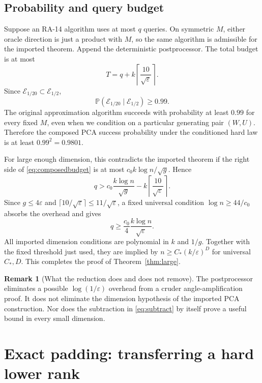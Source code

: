 \documentclass[11pt]{article}
\numberwithin{equation}{section}
\theoremstyle{definition}
\newtheorem{remark}[theorem]{Remark}
\newcommand{\Prb}{\mathbb P}
\newcommand{\eps}{\varepsilon}
\newcommand{\cgood}{\mathcal E}
\begin{document}
\subsection{Probability and query budget}
Suppose an RA-14 algorithm uses at most $q$ queries. On symmetric $M$, either
oracle direction is just a product with $M$, so the same algorithm is
admissible for the imported theorem. Append the deterministic postprocessor.
The total budget is at most
\begin{equation}
 T=q+k\left\lceil\frac{10}{\sqrt\eps}\right\rceil.
 \label{eq:composedbudget}
\end{equation}
Since $\cgood_{1/20}\subset\cgood_{1/2}$,
\[
 \Prb(\cgood_{1/20}\mid\cgood_{1/2})\ge0.99.
\]
The original approximation algorithm succeeds with probability at least
$0.99$ for every fixed $M$, even when we condition on a particular generating
pair $(W,U)$. Therefore the composed PCA success probability under the
conditioned hard law is at least $0.99^2=0.9801$.

For large enough dimension, this contradicts the imported theorem if the
right side of \eqref{eq:composedbudget} is at most
$c_0k\log n/\sqrt g$. Hence
\begin{equation}
 q>c_0\frac{k\log n}{\sqrt g}
     -k\left\lceil\frac{10}{\sqrt\eps}\right\rceil.
 \label{eq:subtract}
\end{equation}
Since $g\le4\eps$ and $\lceil10/\sqrt\eps\rceil\le11/\sqrt\eps$,
a fixed universal condition $\log n\ge44/c_0$ absorbs the overhead and gives
\[
 q\ge\frac{c_0}{4}\frac{k\log n}{\sqrt\eps}.
\]
All imported dimension conditions are polynomial in $k$ and $1/g$.
Together with the fixed threshold just used, they are implied by
$n\ge C_*(k/\eps)^D$ for universal $C_*,D$. This completes the proof of
Theorem~\ref{thm:large}.

\begin{remark}[What the reduction does and does not remove]
The postprocessor eliminates a possible $\log(1/\eps)$ overhead from a
cruder angle-amplification proof. It does not eliminate the dimension
hypothesis of the imported PCA construction. Nor does the subtraction in
\eqref{eq:subtract} by itself prove a useful bound in every small dimension.
\end{remark}

\section{Exact padding: transferring a hard lower rank}
\label{sec:padding}
\end{document}
